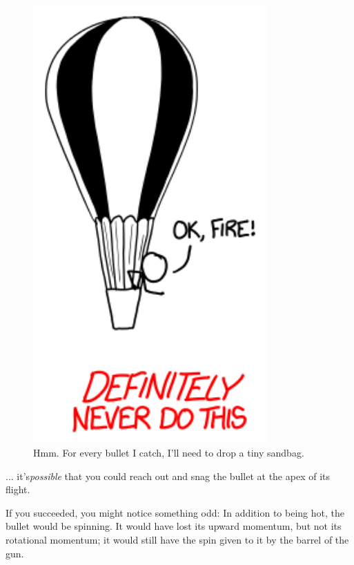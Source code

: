 {\begin{figure}[!htbp]
\centering
\includegraphics[scale=0.5, max width=0.8\textwidth]{imgs/a/81/catch_balloon.png}
\caption{Hmm. For every bullet I catch, I'll need to drop a tiny sandbag.}
\end{figure}

{... it's\emph{possible} that you could reach out and snag the bullet at the apex of its flight.}

{If you succeeded, you might notice something odd: In addition to being hot, the bullet would be spinning. It would have lost its upward momentum, but not its rotational momentum; it would still have the spin given to it by the barrel of the gun.}

}
